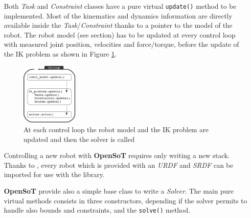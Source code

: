 Both \emph{Task} and \emph{Constraint} classes have a pure virtual \texttt{\small update()} method to be implemented. Most of the kinematics and dynamics information are directly available inside the \emph{Task}/\emph{Constraint} thanks to a pointer to the model of the robot. The robot model (see  section) has to be updated at every control loop with measured joint position, velocities and force/torque, before the update of the IK problem as shown in Figure \ref{update}.

\begin{figure}[!ht]
\vspace{2 mm}
\centering
\includegraphics[width=0.25\textwidth]{images/software/update.eps}
\caption{At each control loop the robot model and the IK problem are updated and then the solver is called}
\label{update}
\end{figure}

Controlling a new robot with \textbf{OpenSoT} requires only writing a new stack. Thanks to , every robot which is provided with an \emph{URDF} and \emph{SRDF} can be imported for use with the library.

\textbf{OpenSoT} provide also a simple base class to write a \emph{Solver}. The main pure virtual methods consists in three constructors, depending if the solver permits to handle also bounds and constraints, and the \texttt{\small solve()} method. 

